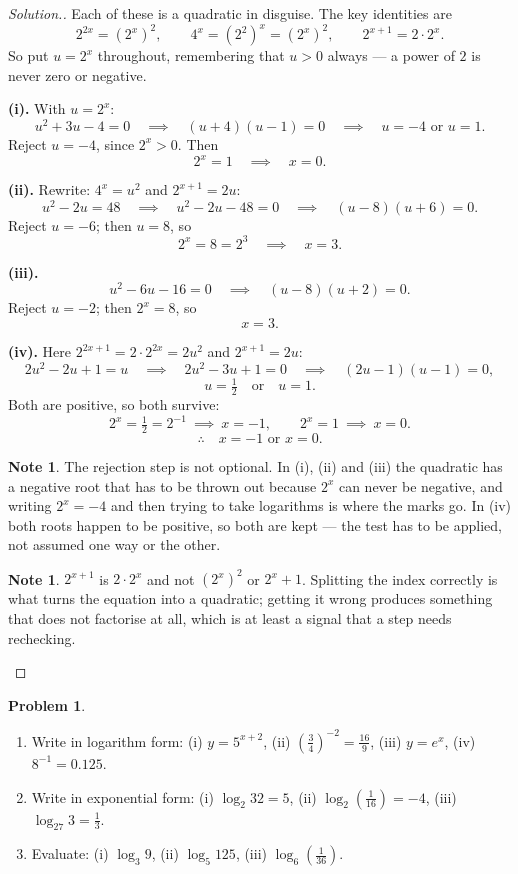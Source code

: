 \documentclass[11pt,a4paper]{article}
\theoremstyle{definition}
\newtheorem{note}[thm]{Note}
\newtheorem{problemx}{Problem}[section]
\newenvironment{problem}{\begin{problemx}}{\end{problemx}}
\newenvironment{solution}
  {\renewcommand{\qedsymbol}{}\begin{proof}[\textit{Solution}.]}
  {\end{proof}}
\begin{document}
\begin{solution}
Each of these is a quadratic in disguise. The key identities are
$$2^{2x}=\left(2^x\right)^2,\qquad 4^x=\left(2^2\right)^x=\left(2^x\right)^2,\qquad
2^{x+1}=2\cdot 2^x.$$
So put $u=2^x$ throughout, remembering that $u>0$ always --- a power of $2$ is never
zero or negative.

\textbf{(i).} With $u=2^x$:
$$u^2+3u-4=0\quad\implies\quad (u+4)(u-1)=0\quad\implies\quad u=-4 \text{ or } u=1.$$
Reject $u=-4$, since $2^x>0$. Then
$$2^x=1\quad\implies\quad x=0.$$

\textbf{(ii).} Rewrite: $4^x=u^2$ and $2^{x+1}=2u$:
$$u^2-2u=48\quad\implies\quad u^2-2u-48=0\quad\implies\quad (u-8)(u+6)=0.$$
Reject $u=-6$; then $u=8$, so
$$2^x=8=2^3\quad\implies\quad x=3.$$

\textbf{(iii).}
$$u^2-6u-16=0\quad\implies\quad (u-8)(u+2)=0.$$
Reject $u=-2$; then $2^x=8$, so
$$x=3.$$

\textbf{(iv).} Here $2^{2x+1}=2\cdot 2^{2x}=2u^2$ and $2^{x+1}=2u$:
$$2u^2-2u+1=u\quad\implies\quad 2u^2-3u+1=0\quad\implies\quad (2u-1)(u-1)=0,$$
$$u=\tfrac{1}{2}\quad\text{or}\quad u=1.$$
Both are positive, so both survive:
$$2^x=\tfrac{1}{2}=2^{-1}\ \implies\ x=-1,\qquad 2^x=1\ \implies\ x=0.$$
$$\therefore\quad x=-1 \text{ or } x=0.$$

\begin{note}
The rejection step is not optional. In (i), (ii) and (iii) the quadratic has a negative
root that has to be thrown out because $2^x$ can never be negative, and writing
$2^x=-4$ and then trying to take logarithms is where the marks go. In (iv) both roots
happen to be positive, so both are kept --- the test has to be applied, not assumed one
way or the other.
\end{note}

\begin{note}
$2^{x+1}$ is $2\cdot 2^x$ and not $\left(2^x\right)^{\!2}$ or $2^x+1$. Splitting the
index correctly is what turns the equation into a quadratic; getting it wrong produces
something that does not factorise at all, which is at least a signal that a step needs
rechecking.
\end{note}
\end{solution}

\begin{problem}
\begin{enumerate}
\item[(a).] Write in logarithm form: \quad (i) $y=5^{x+2}$, \quad
(ii) $\left(\frac{3}{4}\right)^{-2}=\frac{16}{9}$, \quad (iii) $y=e^x$, \quad
(iv) $8^{-1}=0.125$.
\item[(b).] Write in exponential form: \quad (i) $\log_2 32=5$, \quad
(ii) $\log_2\left(\frac{1}{16}\right)=-4$, \quad (iii) $\log_{27}3=\frac{1}{3}$.
\item[(c).] Evaluate: \quad (i) $\log_3 9$, \quad (ii) $\log_5 125$, \quad
(iii) $\log_6\left(\frac{1}{36}\right)$.
\end{enumerate}
\end{problem}
\end{document}

